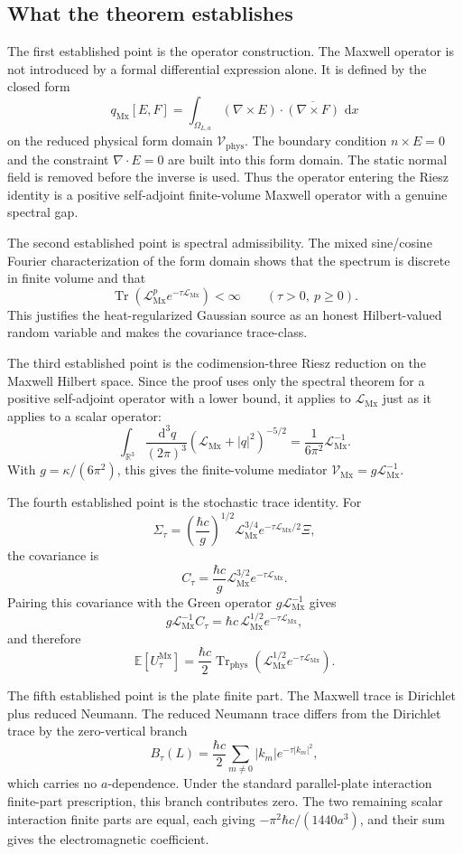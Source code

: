 \documentclass[11pt]{article}
\providecommand{\R}{\mathbb{R}}
\providecommand{\dd}{\,\mathrm{d}}
\providecommand{\hbarc}{\hbar c}
\providecommand{\E}{\mathbb{E}}
\providecommand{\Tr}{\operatorname{Tr}}
\providecommand{\Trphys}{\operatorname{Tr}_{\mathrm{phys}}}
\providecommand{\abs}[1]{\left\lvert #1\right\rvert}
\providecommand{\paren}[1]{\left(#1\right)}
\providecommand{\OmegaLa}{\Omega_{L,a}}
\providecommand{\Vphys}{\mathcal V_{\mathrm{phys}}}
\providecommand{\qMx}{q_{\mathrm{Mx}}}
\providecommand{\LMx}{\mathcal L_{\mathrm{Mx}}}
\providecommand{\VMx}{\mathcal V_{\mathrm{Mx}}}
\providecommand{\XiNoise}{\Xi}
\providecommand{\Sigmatau}{\Sigma_{\tau}}
\providecommand{\Ctau}{C_{\tau}}
\providecommand{\UtauMx}{U_{\tau}^{\mathrm{Mx}}}
\providecommand{\Btau}{B_{\tau}}
\numberwithin{equation}{section}
\begin{document}
\subsection{What the theorem establishes}
\label{subsec:what-the-theorem-establishes}

The first established point is the operator construction.  The Maxwell operator
is not introduced by a formal differential expression alone.  It is defined by
the closed form
\[
    \qMx[E,F]
    =
    \int_{\OmegaLa}
    (\nabla\times E)\cdot\overline{(\nabla\times F)}\,\dd x
\]
on the reduced physical form domain \(\Vphys\).  The boundary condition
\(n\times E=0\) and the constraint \(\nabla\cdot E=0\) are built into this
form domain.  The static normal field is removed before the inverse is used.
Thus the operator entering the Riesz identity is a positive self-adjoint
finite-volume Maxwell operator with a genuine spectral gap.

The second established point is spectral admissibility.  The mixed sine/cosine
Fourier characterization of the form domain shows that the spectrum is
discrete in finite volume and that
\[
    \Tr\paren{\LMx^p e^{-\tau\LMx}}<\infty
    \qquad(\tau>0,
    \ p\geq0).
\]
This justifies the heat-regularized Gaussian source as an honest Hilbert-valued
random variable and makes the covariance trace-class.

The third established point is the codimension-three Riesz reduction on the
Maxwell Hilbert space.  Since the proof uses only the spectral theorem for a
positive self-adjoint operator with a lower bound, it applies to \(\LMx\) just
as it applies to a scalar operator:
\[
    \int_{\R^3}\frac{\dd^3q}{(2\pi)^3}
    (\LMx+\abs q^2)^{-5/2}
    =
    \frac{1}{6\pi^2}\LMx^{-1} .
\]
With \(g=\kappa/(6\pi^2)\), this gives the finite-volume mediator
\(\VMx=g\LMx^{-1}\).

The fourth established point is the stochastic trace identity.  For
\[
    \Sigmatau
    =
    \paren{\frac{\hbarc}{g}}^{1/2}
    \LMx^{3/4}e^{-\tau\LMx/2}\XiNoise,
\]
the covariance is
\[
    \Ctau
    =
    \frac{\hbarc}{g}\LMx^{3/2}e^{-\tau\LMx} .
\]
Pairing this covariance with the Green operator \(g\LMx^{-1}\) gives
\[
    g\LMx^{-1}\Ctau
    =
    \hbarc\,\LMx^{1/2}e^{-\tau\LMx},
\]
and therefore
\[
    \E[\UtauMx]
    =
    \frac{\hbarc}{2}
    \Trphys\paren{\LMx^{1/2}e^{-\tau\LMx}} .
\]

The fifth established point is the plate finite part.  The Maxwell trace is
Dirichlet plus reduced Neumann.  The reduced Neumann trace differs from the
Dirichlet trace by the zero-vertical branch
\[
    \Btau(L)
    =
    \frac{\hbarc}{2}
    \sum_{m\ne0}\abs{k_m}e^{-\tau\abs{k_m}^2},
\]
which carries no \(a\)-dependence.  Under the standard parallel-plate
interaction finite-part prescription, this branch contributes zero.  The two
remaining scalar interaction finite parts are equal, each giving
\(-\pi^2\hbarc/(1440a^3)\), and their sum gives the electromagnetic coefficient.
\end{document}

